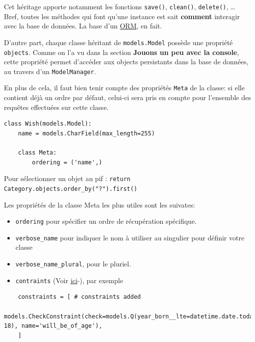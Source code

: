 \documentclass[11pt]{amsbook}
\begin{document}
Cet héritage apporte notamment les fonctions \texttt{save()}, \texttt{clean()}, \texttt{delete()}, …​ Bref, toutes les méthodes qui font qu’une instance est sait \textbf{comment} interagir avec la base de données. La base d’un \href{https://en.wikipedia.org/wiki/Object-relational_mapping}{ORM}, en fait.


D’autre part, chaque classe héritant de \texttt{models.Model} possède une propriété \texttt{objects}. Comme on l’a vu dans la section \textbf{Jouons un peu avec la console}, cette propriété permet d’accéder aux objects persistants dans la base de données, au travers d’un \texttt{ModelManager}.


En plus de cela, il faut bien tenir compte des propriétés \texttt{Meta} de la classe: si elle contient déjà un ordre par défaut, celui-ci sera pris en compte pour l’ensemble des requêtes effectuées sur cette classe.


\begin{verbatim}
class Wish(models.Model):
    name = models.CharField(max_length=255)

    class Meta:
        ordering = ('name',) 
\end{verbatim}


Pour sélectionner un objet au pif : \texttt{return Category.objects.order\_by("?").first()}


Les propriétés de la classe Meta les plus utiles sont les suivates:


\begin{itemize}

\item \texttt{ordering} pour spécifier un ordre de récupération spécifique.

\item \texttt{verbose\_name} pour indiquer le nom à utiliser au singulier pour définir votre classe

\item \texttt{verbose\_name\_plural}, pour le pluriel.

\item \texttt{contraints} (Voir \href{https://girlthatlovestocode.com/django-model}{ici}-), par exemple

\end{itemize}


\begin{verbatim}
    constraints = [ # constraints added
        models.CheckConstraint(check=models.Q(year_born__lte=datetime.date.today().year-18), name='will_be_of_age'),
    ]
\end{verbatim}
\end{document}
